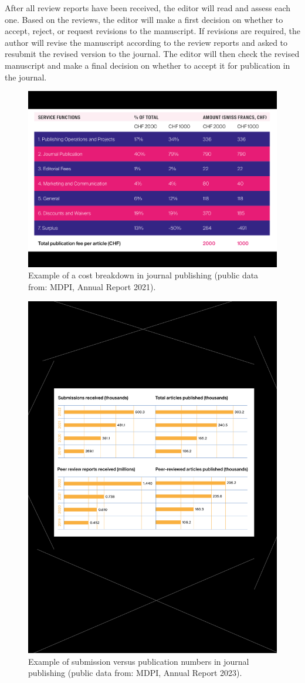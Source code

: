 \documentclass{article}
\begin{document}
After all review reports have been received, the editor will read and assess each one. Based on the reviews, the editor will make a first
decision on whether to accept, reject, or request revisions to the manuscript. If revisions are required, the author will revise the manuscript
according to the review reports and asked to resubmit the revised version to the journal. The editor will then check the revised manuscript
and make a final decision on whether to accept it for publication in the journal.



\begin{figure}[htb]
    \centering
    \caption{Example of a cost breakdown in journal publishing (public data from: MDPI, Annual Report 2021).}
    \label{fig:mdpiFinancials2021}
    \includegraphics[width=0.75\linewidth]{figures/2021_mdpi_financials.pdf}
\end{figure}

\begin{figure}[htb]
    \centering
    \caption{Example of submission versus publication numbers in journal publishing (public data from: MDPI, Annual Report 2023).}
    \label{fig:mdpiSubmissions2022}
    \includegraphics[width=0.75\linewidth]{figures/2022_mdpi_submissions.pdf}
\end{figure}
\end{document}
